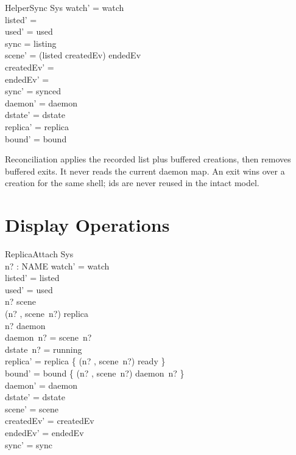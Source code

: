 \documentclass[a4paper,10pt,fleqn]{article}
\begin{document}
\begin{schema}{HelperSync}
  \Delta Sys
\where
  watch' = watch \\
  listed' = \emptyset \\
  used' = used \\
  sync = listing \\
  scene' = (listed \cup createdEv) \setminus endedEv \\
  createdEv' = \emptyset \\
  endedEv' = \emptyset \\
  sync' = synced \\
  daemon' = daemon \\
  dstate' = dstate \\
  replica' = replica \\
  bound' = bound
\end{schema}

Reconciliation applies the recorded list plus buffered creations, then
removes buffered exits. It never reads the current daemon map. An exit wins
over a creation for the same shell; ids are never reused in the intact model.

\section{Display Operations}

\begin{schema}{ReplicaAttach}
  \Delta Sys \\
  n? : NAME
\where
  watch' = watch \\
  listed' = listed \\
  used' = used \\
  n? \in \dom scene \\
  (n? , scene~n?) \notin \dom replica \\
  n? \in \dom daemon \\
  daemon~n? = scene~n? \\
  dstate~n? = running \\
  replica' = replica \cup \{ (n? , scene~n?) \mapsto ready \} \\
  bound' = bound \cup \{ (n? , scene~n?) \mapsto daemon~n? \} \\
  daemon' = daemon \\
  dstate' = dstate \\
  scene' = scene \\
  createdEv' = createdEv \\
  endedEv' = endedEv \\
  sync' = sync
\end{schema}
\end{document}
